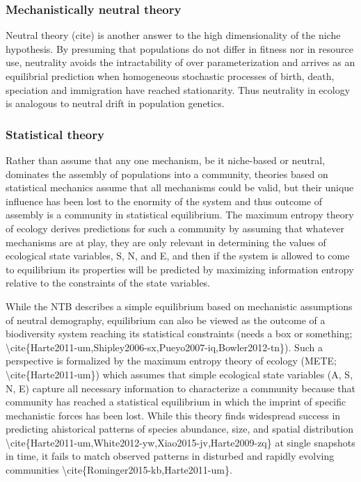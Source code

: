 \documentclass[]{article}
\begin{document}
\subsubsection{Mechanistically neutral theory
}\label{mechanistically-neutral-theory}

Neutral theory (cite) is another answer to the high dimensionality of
the niche hypothesis. By presuming that populations do not differ in
fitness nor in resource use, neutrality avoids the intractability of
over parameterization and arrives as an equilibrial prediction when
homogeneous stochastic processes of birth, death, speciation and
immigration have reached stationarity. Thus neutrality in ecology is
analogous to neutral drift in population genetics.

\subsubsection{Statistical theory}\label{statistical-theory}

Rather than assume that any one mechanism, be it niche-based or neutral,
dominates the assembly of populations into a community, theories based
on statistical mechanics assume that all mechanisms could be valid, but
their unique influence has been lost to the enormity of the system and
thus outcome of assembly is a community in statistical equilibrium. The
maximum entropy theory of ecology derives predictions for such a
community by assuming that whatever mechanisms are at play, they are
only relevant in determining the values of ecological state variables,
S, N, and E, and then if the system is allowed to come to equilibrium
its properties will be predicted by maximizing information entropy
relative to the constraints of the state variables.

While the NTB describes a simple equilibrium based on mechanistic
assumptions of neutral demography, equilibrium can also be viewed as the
outcome of a biodiversity system reaching its statistical constraints
(needs a box or something;
\textbackslash{}cite\{Harte2011-um,Shipley2006-sx,Pueyo2007-iq,Bowler2012-tn\}).
Such a perspective is formalized by the maximum entropy theory of
ecology (METE; \textbackslash{}cite\{Harte2011-um\}) which assumes that
simple ecological state variables (A, S, N, E) capture all necessary
information to characterize a community because that community has
reached a statistical equilibrium in which the imprint of specific
mechanistic forces has been lost. While this theory finds widespread
success in predicting ahistorical patterns of species abundance, size,
and spatial distribution
\textbackslash{}cite\{Harte2011-um,White2012-yw,Xiao2015-jv,Harte2009-zq\}
at single snapshots in time, it fails to match observed patterns in
disturbed and rapidly evolving communities
\textbackslash{}cite\{Rominger2015-kb,Harte2011-um\}.
\end{document}
